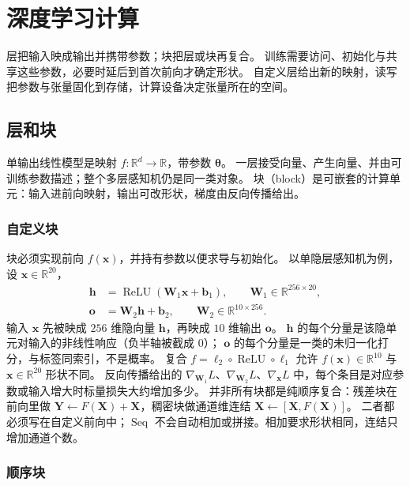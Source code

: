 \chapter{深度学习计算}

层把输入映成输出并携带参数；块把层或块再复合。
训练需要访问、初始化与共享这些参数，必要时延后到首次前向才确定形状。
自定义层给出新的映射，读写把参数与张量固化到存储，计算设备决定张量所在的空间。

\section{层和块}



单输出线性模型是映射 $f:\mathbb{R}^{d}\to\mathbb{R}$，带参数 $\bm{\theta}$。
一层接受向量、产生向量、并由可训练参数描述；整个多层感知机仍是同一类对象。
块（block）是可嵌套的计算单元：输入进前向映射，输出可改形状，梯度由反向传播给出。

\subsection{自定义块}

块必须实现前向 $f(\bm{x})$，并持有参数以便求导与初始化。
以单隐层感知机为例，设 $\bm{x}\in\mathbb{R}^{20}$，
\begin{align*}
\bm{h}
&=
\operatorname{ReLU}(\bm{W}_1\bm{x}+\bm{b}_1),
\qquad
\bm{W}_1\in\mathbb{R}^{256\times 20},\\
\bm{o}
&=
\bm{W}_2\bm{h}+\bm{b}_2,
\qquad
\bm{W}_2\in\mathbb{R}^{10\times 256}.
\end{align*}
输入 $\bm{x}$ 先被映成 $256$ 维隐向量 $\bm{h}$，再映成 $10$ 维输出 $\bm{o}$。
$\bm{h}$ 的每个分量是该隐单元对输入的非线性响应（负半轴被截成 $0$）；
$\bm{o}$ 的每个分量是一类的未归一化打分，与标签同索引，不是概率。
复合 $f=\ell_2\circ\operatorname{ReLU}\circ\ell_1$ 允许 $f(\bm{x})\in\mathbb{R}^{10}$ 与 $\bm{x}\in\mathbb{R}^{20}$ 形状不同。
反向传播给出的 $\nabla_{\bm{W}_1}L$、$\nabla_{\bm{W}_2}L$、$\nabla_{\bm{x}}L$ 中，每个条目是对应参数或输入增大时标量损失大约增加多少。
并非所有块都是纯顺序复合：残差块在前向里做 $\bm{Y}\leftarrow F(\bm{X})+\bm{X}$，稠密块做通道维连结 $\bm{X}\leftarrow[\bm{X},F(\bm{X})]$。
二者都必须写在自定义前向中；$\operatorname{Seq}$ 不会自动相加或拼接。相加要求形状相同，连结只增加通道个数。

\subsection{顺序块}

